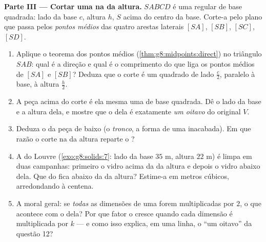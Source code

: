 \begin{problem}
\medskip
\noindent\textbf{Parte III --- Cortar uma  na  da
altura.}
$SABCD$ é uma  regular de base quadrada: lado da base $c$,
altura $h$,  $S$ acima do centro da base. Corte-a pelo plano que
passa pelos \emph{pontos médios} das quatro arestas laterais $[SA]$,
$[SB]$, $[SC]$, $[SD]$.
\begin{enumerate}[resume]
  \item Aplique o teorema dos pontos médios
        (\cref{thm:g8:midpoints:direct}) no triângulo $SAB$: qual é a
        direção e qual é o comprimento do  que liga os pontos
        médios de $[SA]$ e $[SB]$? Deduza que o corte é um quadrado de
        lado $\frac{c}{2}$, paralelo à base, à altura $\frac{h}{2}$.
  \item A peça acima do corte é ela mesma uma  de base
        quadrada. Dê o lado da base e a altura dela, e mostre que o
         dela é exatamente \emph{um oitavo} do  original
        $V$.
  \item Deduza o  da peça de baixo (o \emph{tronco}, a forma de
        uma  inacabada). Em que razão o corte na  da
        altura reparte o ?
  \item A  do Louvre (\cref{exo:g8:solids:7}: lado da base
        $35$ m, altura $22$ m) é limpa em duas campanhas: primeiro o
        vidro acima da  da altura e depois o vidro abaixo dela.
        Que  do \emph{} fica abaixo da  da altura?
        Estime-a em metros cúbicos, arredondando à centena.
  \item A moral geral: se \emph{todas} as dimensões de uma 
        forem multiplicadas por $2$, o que acontece com o  dela?
        Por que fator o  cresce quando cada dimensão é
        multiplicada por $k$ --- e como isso explica, em uma linha, o
        ``um oitavo'' da questão 12?
\end{enumerate}
\end{problem}
